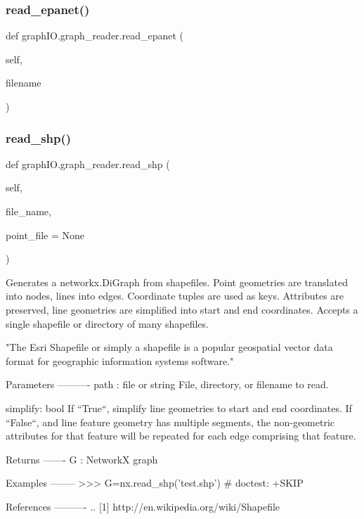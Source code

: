 \subsubsection{read\+\_\+epanet()}
{\footnotesize\ttfamily def graph\+I\+O.\+graph\+\_\+reader.\+read\+\_\+epanet (\begin{DoxyParamCaption}\item[{}]{self,  }\item[{}]{filename }\end{DoxyParamCaption})}

\mbox{\label{classgraph_i_o_1_1graph__reader_a944d0cebc05facbfe9d68c7aa69f9e84}} 
\subsubsection{read\+\_\+shp()}
{\footnotesize\ttfamily def graph\+I\+O.\+graph\+\_\+reader.\+read\+\_\+shp (\begin{DoxyParamCaption}\item[{}]{self,  }\item[{}]{file\+\_\+name,  }\item[{}]{point\+\_\+file = {\ttfamily None} }\end{DoxyParamCaption})}

\begin{DoxyVerb}Generates a networkx.DiGraph from shapefiles. Point geometries are
translated into nodes, lines into edges. Coordinate tuples are used as
keys. Attributes are preserved, line geometries are simplified into
start and end coordinates. Accepts a single shapefile or directory of
many shapefiles.

"The Esri Shapefile or simply a shapefile is a popular geospatial
vector data format for geographic information systems software."

Parameters
----------
path : file or string
   File, directory, or filename to read.

simplify:  bool
    If ``True``, simplify line geometries to start and end coordinates.
    If ``False``, and line feature geometry has multiple segments, the
    non-geometric attributes for that feature will be repeated for each
    edge comprising that feature.

Returns
-------
G : NetworkX graph

Examples
--------
>>> G=nx.read_shp('test.shp') # doctest: +SKIP

References
----------
.. [1] http://en.wikipedia.org/wiki/Shapefile
\end{DoxyVerb}
 \mbox{\label{classgraph_i_o_1_1graph__reader_a9a8e5a3d1e940f83fb725615ef87581a}} 
